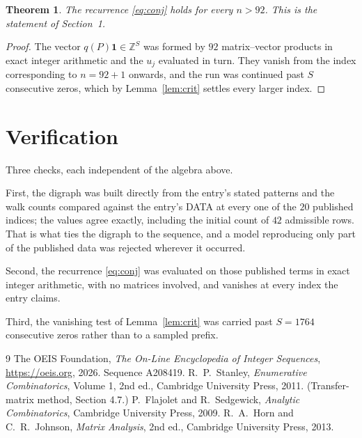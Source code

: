 \documentclass[11pt,a4paper]{article}
\theoremstyle{plain}
\newtheorem{theorem}{Theorem}
\theoremstyle{definition}
\begin{document}
\begin{theorem}
The recurrence \eqref{eq:conj} holds for every $n>92$. This is the statement of
Section~1.
\end{theorem}

\begin{proof}
The vector $q(P)\mathbf{1}\in\mathbb{Z}^{S}$ was formed by $92$ matrix--vector
products in exact integer arithmetic and the $u_j$ evaluated in turn. They vanish from the
index corresponding to $n=92+1$ onwards, and the run was continued past $S$ consecutive
zeros, which by Lemma~\ref{lem:crit} settles every larger index.
\end{proof}

\section{Verification}

Three checks, each independent of the algebra above.

First, the digraph was built directly from the entry's stated patterns and the walk counts
compared against the entry's DATA at every one of the $20$ published indices; the
values agree exactly, including the initial count of $42$ admissible rows. That is
what ties the digraph to the sequence, and a model reproducing only part of the published
data was rejected wherever it occurred.

Second, the recurrence \eqref{eq:conj} was evaluated on those published terms in exact
integer arithmetic, with no matrices involved, and vanishes at every index the entry claims.

Third, the vanishing test of Lemma~\ref{lem:crit} was carried past $S=1764$ consecutive
zeros rather than to a sampled prefix.

\begin{thebibliography}{9}
 The OEIS Foundation, \emph{The On-Line Encyclopedia of Integer
Sequences}, \url{https://oeis.org}, 2026. Sequence A208419.
 R.~P.~Stanley, \emph{Enumerative Combinatorics}, Volume 1, 2nd ed.,
Cambridge University Press, 2011. (Transfer-matrix method, Section 4.7.)
 P.~Flajolet and R.~Sedgewick, \emph{Analytic Combinatorics}, Cambridge
University Press, 2009.
 R.~A.~Horn and C.~R.~Johnson, \emph{Matrix Analysis}, 2nd ed., Cambridge
University Press, 2013.
\end{thebibliography}
\end{document}

